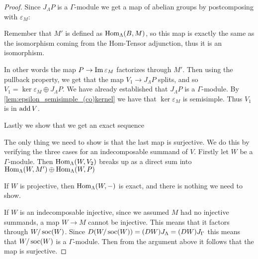 \begin{theorem}
\begin{proof}
		Since $J_\Lambda P$ is a $\Gamma$-module we get a map of abelian groups by postcomposing with $\varepsilon_M$:
		\begin{center}
		\end{center} 
		Remember that $M'$ is defined as $\operatorname{Hom}_\Lambda(B, M)$, so this map is exactly the same as the isomorphism coming from the Hom-Tensor adjunction, thus it is an isomorphism.
		\begin{center}
		\end{center} 
		In other words the map $P \to \operatorname{Im} \varepsilon_M$ factorizes through $M'$. Then using the pullback property, we get that the map $V_1 \to J_\Lambda P$ splits, and so $V_1 = \ker\varepsilon_M \oplus J_\Lambda P$. We have already established that $J_\Lambda P$ is a $\Gamma$-module. By \cref{lem:epsilon_semisimple_(co)kernel} we have that $\ker\varepsilon_M$ is semisimple. Thus $V_1$ is in $\operatorname{add} V$.
		
		Lastly we show that we get an exact sequence
		\begin{center}
		\end{center} 
		The only thing we need to show is that the last map is surjective. We do this by verifying the three cases for an indecomposable summand of $V$. Firstly let $W$ be a $\Gamma$-module. Then $\operatorname{Hom}_\Lambda(W, V_2)$ breaks up as a direct sum into $\operatorname{Hom}_\Lambda(W, M') \oplus \operatorname{Hom}_\Lambda(W, P)$ 
		
		If $W$ is projective, then $\operatorname{Hom}_\Lambda(W, -)$ is exact, and there is nothing we need to show.
		
		If $W$ is an indecomposable injective, since we assumed $M$ had no injective summands, a map $W \to M$ cannot be injective. This means that it factors through $W/\operatorname{soc}(W)$. Since $D(W/\operatorname{soc}(W)) = (DW)J_\Lambda = (DW)J_\Gamma$ this means that $W/\operatorname{soc}(W)$ is a $\Gamma$-module. Then from the argument above it follows that the map is surjective.
		

\end{proof}
\end{theorem}
